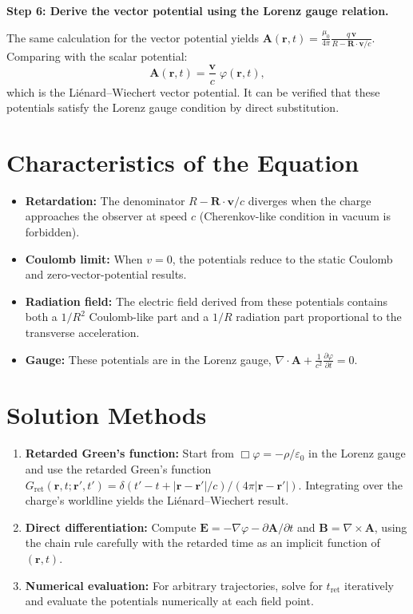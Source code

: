 \textbf{Step 6: Derive the vector potential using the Lorenz gauge relation.}

The same calculation for the vector potential yields $\mathbf{A}(\mathbf{r},t) = \frac{\mu_{0}}{4\pi}\frac{q\,\mathbf{v}}{R - \mathbf{R}\cdot\mathbf{v}/c}$. Comparing with the scalar potential:
\begin{equation}
\mathbf{A}(\mathbf{r},t) = \frac{\mathbf{v}}{c}\;\varphi(\mathbf{r},t),
\end{equation}
which is the Li\'enard--Wiechert vector potential. It can be verified that these potentials satisfy the Lorenz gauge condition by direct substitution.

\section*{Characteristics of the Equation}

\begin{itemize}
  \item \textbf{Retardation:} The denominator $R - \mathbf{R}\cdot\mathbf{v}/c$ diverges when the charge approaches the observer at speed $c$ (Cherenkov-like condition in vacuum is forbidden).
  \item \textbf{Coulomb limit:} When $v = 0$, the potentials reduce to the static Coulomb and zero-vector-potential results.
  \item \textbf{Radiation field:} The electric field derived from these potentials contains both a $1/R^{2}$ Coulomb-like part and a $1/R$ radiation part proportional to the transverse acceleration.
  \item \textbf{Gauge:} These potentials are in the Lorenz gauge, $\nabla\cdot\mathbf{A} + \frac{1}{c^{2}}\frac{\partial\varphi}{\partial t} = 0$.
\end{itemize}
\section*{Solution Methods}

\begin{enumerate}
  \item \textbf{Retarded Green's function:} Start from $\Box\varphi = -\rho/\varepsilon_{0}$ in the Lorenz gauge and use the retarded Green's function $G_{\text{ret}}(\mathbf{r},t;\mathbf{r}',t') = \delta(t' - t + |\mathbf{r}-\mathbf{r}'|/c)/(4\pi|\mathbf{r}-\mathbf{r}'|)$. Integrating over the charge's worldline yields the Liénard--Wiechert result.
  \item \textbf{Direct differentiation:} Compute $\mathbf{E} = -\nabla\varphi - \partial\mathbf{A}/\partial t$ and $\mathbf{B} = \nabla\times\mathbf{A}$, using the chain rule carefully with the retarded time as an implicit function of $(\mathbf{r}, t)$.
  \item \textbf{Numerical evaluation:} For arbitrary trajectories, solve for $t_{\text{ret}}$ iteratively and evaluate the potentials numerically at each field point.
\end{enumerate}
